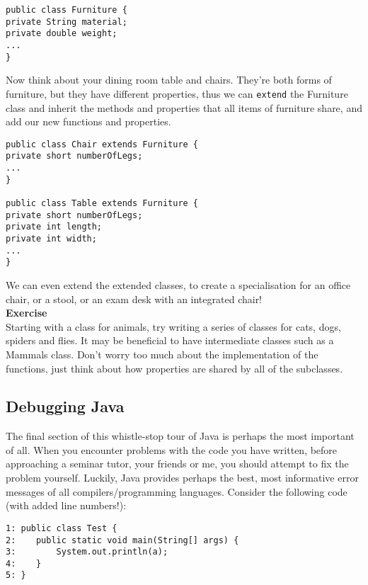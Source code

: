 \begin{verbatim}
public class Furniture {
private String material;
private double weight;
...
}
\end{verbatim}

\noindent
Now think about your dining room table and chairs. They're both forms of furniture, but they have different properties, thus we can {\tt extend} the Furniture class and inherit the methods and properties that all items of furniture share, and add our new functions and properties.

\begin{verbatim}
public class Chair extends Furniture {
private short numberOfLegs;
...
}

public class Table extends Furniture {
private short numberOfLegs;
private int length;
private int width;
...
}
\end{verbatim}

\noindent
We can even extend the extended classes, to create a specialisation for an office chair, or a stool, or an exam desk with an integrated chair!\\

\noindent
{\bf Exercise}\\

\noindent
Starting with a class for animals, try writing a series of classes for cats, dogs, spiders and flies. It may be beneficial to have intermediate classes such as a Mammals class. Don't worry too much about the implementation of the functions, just think about how properties are shared by all of the subclasses.

\subsection{Debugging Java}

The final section of this whistle-stop tour of Java is perhaps the most important of all. When you encounter problems with the code you have written, before approaching a seminar tutor, your friends or me, you should attempt to fix the problem yourself. Luckily, Java provides perhaps the best, most informative error messages of all compilers/programming languages. Consider the following code (with added line numbers!):

\begin{verbatim}
1: public class Test {
2:    public static void main(String[] args) {
3:        System.out.println(a);
4:    }
5: }
\end{verbatim}

